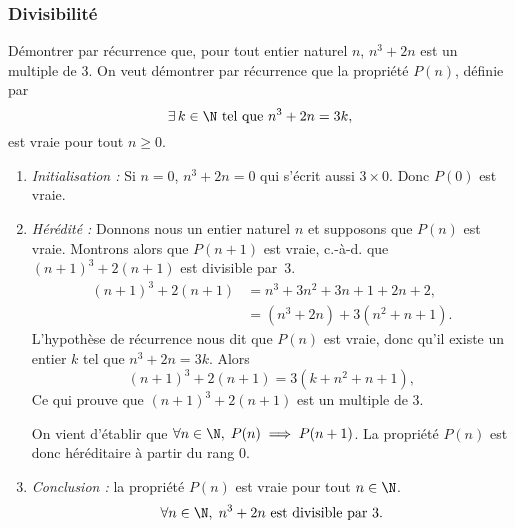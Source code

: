 \subsubsection{Divisibilité}
Démontrer par récurrence que, pour tout entier naturel $n$, $n^3+2n$ est un multiple de $3$.
On veut démontrer par récurrence que la propriété $P(n)$, définie par
\[
\exists\, k\in\N \text{ tel que }n^3+2n=3k,
\]
est vraie pour tout $n≥0$.
\begin{enumerate}
\item \textit{Initialisation :} Si $n=0$, $n^3+2n=0$ qui s'écrit aussi $3\times0$. Donc $P(0)$ est vraie.
\item \textit{Hérédité :} Donnons nous un entier naturel $n$ et supposons que $P(n)$ est vraie. Montrons alors que $P(n+1)$ est vraie, c.-à-d. que $(n+1)^3+2(n+1)$ est divisible par~$3$.
\begin{align*}
(n+1)^3+2(n+1)&=n^3+3n^2+3n+1+2n+2,\\
&=(n^3+2n)+3(n^2+n+1).
\end{align*}
L'hypothèse de récurrence nous dit que $P(n)$ est vraie, donc qu'il existe un entier $k$ tel que \mbox{$n^3+2n=3k$}. Alors
\[(n+1)^3+2(n+1)=3(k+n^2+n+1),\]
Ce qui prouve que $(n+1)^3+2(n+1)$ est un multiple de 3.

On vient d'établir que $\forall n\in\N,\;P(n)\implies P(n+1)$. La propriété $P(n)$ est donc héréditaire à partir du rang $0$.
\item \textit{Conclusion :} la propriété $P(n)$ est vraie pour tout $n\in\N$. 
\[
\forall n\in\N,\; n^3+2n \text{ est divisible par $3$.}
\]
\end{enumerate}

\endinput
